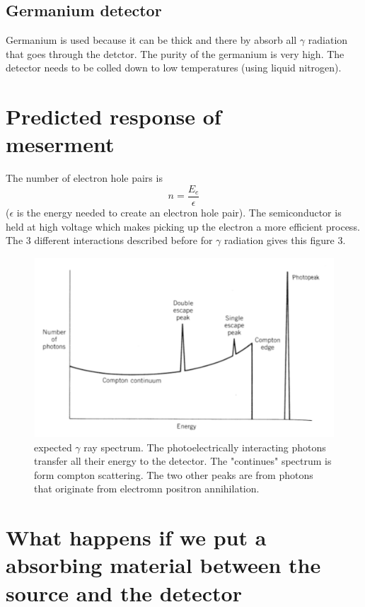 \documentclass[]{article}
\begin{document}
\subsection{Germanium detector}

Germanium is used because it can be thick and there by absorb all $\gamma$ radiation that goes through the detctor. The purity of the germanium is very high. The detector needs to be colled down to low temperatures (using liquid nitrogen). 

\section{Predicted response of \\ meserment}

The number of electron hole pairs is $$n=\frac{E_e}{\epsilon}$$ ($\epsilon$ is the energy needed to create an electron hole pair). The semiconductor is held at high voltage which makes picking up the electron a more efficient process. The 3 different interactions described before for $\gamma$ radiation gives this figure 3.
\begin{figure}
	\includegraphics[width=\linewidth]{gamma-ray-spectrum.png}
	\caption{expected $\gamma$ ray spectrum. The photoelectrically interacting photons transfer all their energy to the detector. The "continues" spectrum is form compton scattering. The two other peaks are from photons that originate from electromn positron annihilation.}
	\label{fig:Effective gamma spectrum}
\end{figure}

\section{What happens if we put a \\ absorbing material between the source and the detector}
\end{document}
